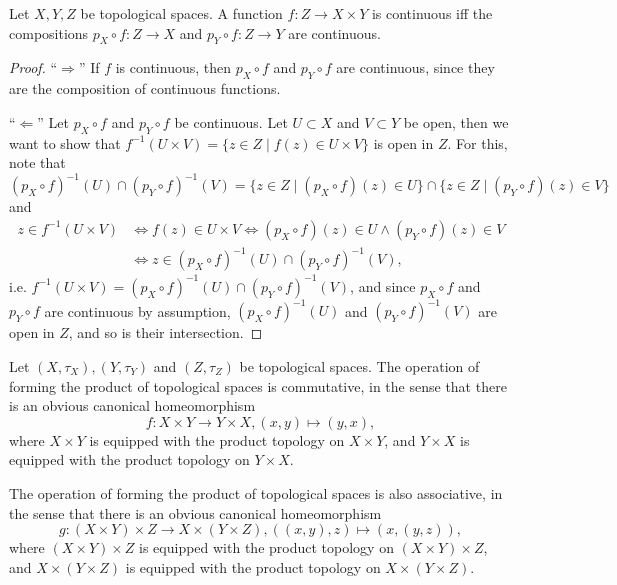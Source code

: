 \begin{theorem}
	Let $X, Y, Z$ be topological spaces. A function $f: Z\to X\times Y$ is continuous iff the compositions $p_X\circ f: Z\to X$ and $p_Y\circ f: Z\to Y$ are continuous.
\end{theorem}

\begin{proof}
	\enquote{$\Longrightarrow$} If $f$ is continuous, then $p_X\circ f$ and $p_Y\circ f$ are continuous, since they are the composition of continuous functions.
	
	\enquote{$\Longleftarrow$} Let $p_X\circ f$ and $p_Y\circ f$ be continuous. Let $U\subset X$ and $V\subset Y$ be open, then we want to show that $f^{-1}(U\times V) = \{z\in Z\mid f(z)\in U\times V\}$ is open in $Z$. For this, note that $$\left(p_X\circ f\right)^{-1}(U) \cap \left(p_Y\circ f\right)^{-1}(V) = \{z\in Z\mid (p_X\circ f)(z) \in U\} \cap \{z\in Z\mid (p_Y\circ f)(z)\in V\}$$ and
	\begin{align*}
		z\in f^{-1}(U\times V) &\Leftrightarrow f(z)\in U\times V \Leftrightarrow (p_X\circ f)(z) \in U \wedge (p_Y\circ f)(z)\in V
		\\ &\Leftrightarrow z\in (p_X\circ f)^{-1}(U)\cap (p_Y\circ f)^{-1}(V),
	\end{align*}
	i.e. $f^{-1}(U\times V) = (p_X\circ f)^{-1}(U)\cap (p_Y\circ f)^{-1}(V)$, and since $p_X\circ f$ and $p_Y\circ f$ are continuous by assumption, $(p_X\circ f)^{-1}(U)$ and $(p_Y\circ f)^{-1}(V)$ are open in $Z$, and so is their intersection.
\end{proof}

\begin{remark}\label{remark:op_prod_top_spaces_comm_associat}
	Let $(X, \tau_X), (Y, \tau_Y)$ and $(Z, \tau_Z)$ be topological spaces. The operation of forming the product of topological spaces is commutative, in the sense that there is an obvious canonical homeomorphism $$f: X\times Y\to Y\times X, (x, y)\mapsto (y, x),$$ where $X\times Y$ is equipped with the product topology on $X\times Y$, and $Y\times X$ is equipped with the product topology on $Y\times X$. 
	
	The operation of forming the product of topological spaces is also associative, in the sense that there is an obvious canonical homeomorphism $$g: \left(X\times Y\right)\times Z\to X\times (Y\times Z), ((x, y), z)\mapsto (x, (y, z)),$$ where $(X\times Y)\times Z$ is equipped with the product topology on $(X\times Y)\times Z$, and $X\times (Y\times Z)$ is equipped with the product topology on $X\times (Y\times Z)$.
\end{remark}

